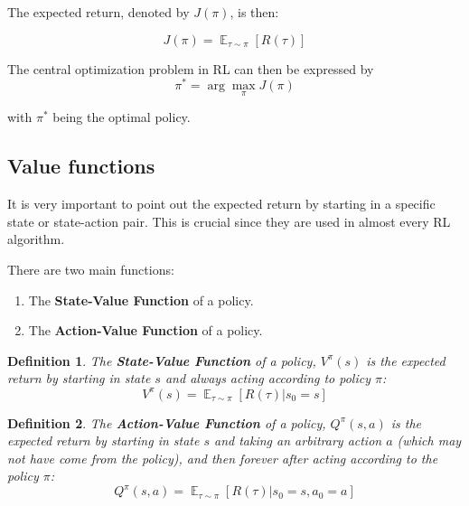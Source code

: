 \documentclass{article}
\newtheorem{definition}{Definition}
\DeclareMathOperator*{\E}{\mathbb{E}}
\begin{document}
The expected return, denoted by $J(\pi)$, is then:

\begin{equation}
J(\pi) = \E_{\tau\sim \pi}{[R(\tau)]}
\label{eq:loss}
\end{equation}

The central optimization problem in RL can then be expressed by
\begin{equation}
\pi^* = \arg \max_{\pi} J(\pi)
\label{eq:max_loss}
\end{equation}

with $\pi^*$ being the optimal policy.


\subsection{Value functions}
It is very important to point out the expected return by starting in a specific state or state-action pair. This is crucial since they are used in almost every RL algorithm.

There are two main functions: \cite{silver2015}

\begin{enumerate}
	\item The \textbf{State-Value Function} of a policy.
	
	\item The \textbf{Action-Value Function} of a policy.
	
\end{enumerate}

	
\begin{definition}
	The \textbf{State-Value Function} of a policy, $V^{\pi}(s)$ is the expected return by starting in state $s$ and always acting according to policy $\pi$:
	\begin{equation}
		V^{\pi}(s) = \E_{\tau \sim \pi} [R(\tau)| s_0 = s]
	\end{equation}
\end{definition}

\begin{definition}
	The \textbf{Action-Value Function} of a policy, $Q^{\pi}(s,a)$ is the expected return by starting in state $s$ and taking an arbitrary action $a$ (which may not have come from the policy), and then forever after acting according to the policy $\pi$:
	\begin{equation}
			Q^{\pi}(s,a) = \E_{\tau \sim \pi}[R(\tau)| s_0 = s, a_0 = a]	
	\end{equation}
	
\end{definition}
\end{document}
